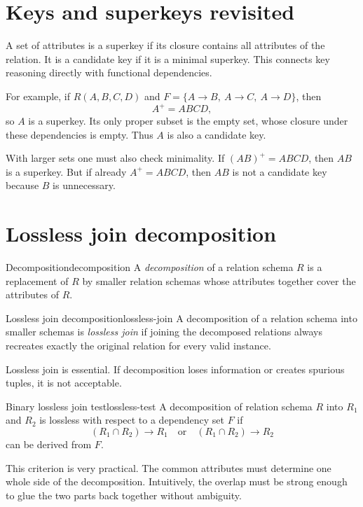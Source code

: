 \documentclass[11pt,a4paper,openany]{book}
\begin{document}
\section{Keys and superkeys revisited}
A set of attributes is a superkey if its closure contains all attributes of the relation. It is a candidate key if it is a minimal superkey. This connects key reasoning directly with functional dependencies.

For example, if \(R(A,B,C,D)\) and \(F=\{A\to B,\ A\to C,\ A\to D\}\), then
\[
A^+=ABCD,
\]
so \(A\) is a superkey. Its only proper subset is the empty set, whose closure under these dependencies is empty. Thus \(A\) is also a candidate key.

With larger sets one must also check minimality. If \((AB)^+=ABCD\), then \(AB\) is a superkey. But if already \(A^+=ABCD\), then \(AB\) is not a candidate key because \(B\) is unnecessary.

\section{Lossless join decomposition}
\begin{definition}{Decomposition}{decomposition}
A \emph{decomposition} of a relation schema \(R\) is a replacement of \(R\) by smaller relation schemas whose attributes together cover the attributes of \(R\).
\end{definition}

\begin{definition}{Lossless join decomposition}{lossless-join}
A decomposition of a relation schema into smaller schemas is \emph{lossless join} if joining the decomposed relations always recreates exactly the original relation for every valid instance.
\end{definition}

Lossless join is essential. If decomposition loses information or creates spurious tuples, it is not acceptable.

\begin{theorem}{Binary lossless join test}{lossless-test}
A decomposition of relation schema \(R\) into \(R_1\) and \(R_2\) is lossless with respect to a dependency set \(F\) if
\[
(R_1 \cap R_2) \to R_1 \quad \text{or} \quad (R_1 \cap R_2) \to R_2
\]
can be derived from \(F\).
\end{theorem}

This criterion is very practical. The common attributes must determine one whole side of the decomposition. Intuitively, the overlap must be strong enough to glue the two parts back together without ambiguity.
\end{document}
